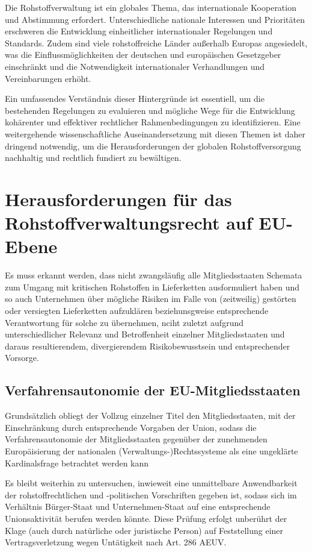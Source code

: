 \documentclass[12pt,a4paper,oneside]{book} %
\begin{document}
{	Die Rohstoffverwaltung ist ein globales Thema, das internationale Kooperation und Abstimmung erfordert. Unterschiedliche nationale Interessen und Prioritäten erschweren die Entwicklung einheitlicher internationaler Regelungen und Standards. Zudem sind viele rohstoffreiche Länder außerhalb Europas angesiedelt, was die Einflussmöglichkeiten der deutschen und europäischen Gesetzgeber einschränkt und die Notwendigkeit internationaler Verhandlungen und Vereinbarungen erhöht.
	
	Ein umfassendes Verständnis dieser Hintergründe ist essentiell, um die bestehenden Regelungen zu evaluieren und mögliche Wege für die Entwicklung kohärenter und effektiver rechtlicher Rahmenbedingungen zu identifizieren. Eine weitergehende wissenschaftliche Auseinandersetzung mit diesen Themen ist daher dringend notwendig, um die Herausforderungen der globalen Rohstoffversorgung nachhaltig und rechtlich fundiert zu bewältigen.
	
	
	
	\section{Herausforderungen für das Rohstoffverwaltungsrecht auf EU-Ebene}
	Es muss erkannt werden, dass nicht zwangsläufig alle Mitgliedsstaaten Schemata zum Umgang mit kritischen Rohstoffen in Lieferketten ausformuliert haben und so auch Unternehmen über mögliche Risiken im Falle von (zeitweilig) gestörten oder versiegten Lieferketten aufzuklären beziehunsgweise entsprechende Verantwortung für solche zu übernehmen, nciht zuletzt aufgrund unterschiedlicher Relevanz und Betroffenheit einzelner Mitgliedsstaaten und daraus resultierendem, divergierendem Risikobewusstsein und entsprechender Vorsorge.
	
	\subsection{Verfahrensautonomie der EU-Mitgliedsstaaten}
	Grundsätzlich obliegt der Vollzug einzelner Titel den Mitgliedsstaaten, mit der Einschränkung durch entsprechende Vorgaben der Union, sodass die Verfahrensautonomie der Mitgliedsstaaten gegenüber der zunehmenden Europäisierung der nationalen (Verwaltungs-)Rechtssysteme als eine \glqq ungeklärte Kardinalsfrage\grqq \autocite{Ludiwgs, NVwZ 2018, 1417} betrachtet werden kann
	
	Es bleibt weiterhin zu untersuchen, inwieweit eine unmittelbare Anwendbarkeit der rohstoffrechtlichen und -politischen Vorschriften gegeben ist, sodass sich im Verhältnis Bürger-Staat und Unternehmen-Staat auf eine entsprechende Unionsaktivität berufen werden könnte. Diese Prüfung erfolgt unberührt der Klage (auch durch natürliche oder juristische Person) auf Feststellung einer Vertragsverletzung wegen Untätigkeit nach Art. 286 AEUV.
	
}
\end{document}
